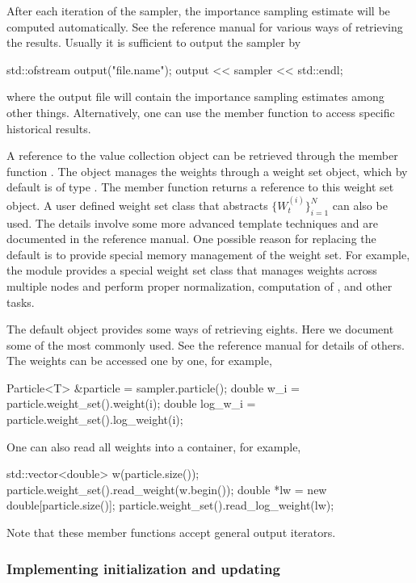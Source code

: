 \documentclass[11pt, bib, hyper, mint, minted=cache]{marticle}
\begin{document}
After each iteration of the sampler, the importance sampling estimate will be
computed automatically. See the reference manual for various ways of
retrieving the results. Usually it is sufficient to output the sampler by
\begin{cppcode}
std::ofstream output("file.name");
output << sampler << std::endl;
\end{cppcode}
where the output file will contain the importance sampling estimates among
other things. Alternatively, one can use the 
member function to access specific historical results.

A reference to the value collection  object can be retrieved
through the member function . The
 object manages the weights through a weight set
object, which by default is of type . The
 member function returns a reference to
this weight set object. A user defined weight set class that abstracts
$\{W_t^{(i)}\}_{i=1}^N$ can also be used. The details involve some more
advanced \cpp template techniques and are documented in the reference manual.
One possible reason for replacing the default is to provide special memory
management of the weight set. For example, the \lmpi module provides a special
weight set class that manages weights across multiple nodes and perform proper
normalization, computation of \ess, and other tasks.

The default  object provides some ways of retrieving
eights. Here we document some of the most commonly used. See the reference
manual for details of others. The weights can be accessed one by one, for
example,
\begin{cppcode}
Particle<T> &particle = sampler.particle();
double w_i     = particle.weight_set().weight(i);
double log_w_i = particle.weight_set().log_weight(i);
\end{cppcode}
One can also read all weights into a container, for example,
\begin{cppcode}
std::vector<double> w(particle.size());
particle.weight_set().read_weight(w.begin());
double *lw = new double[particle.size()];
particle.weight_set().read_log_weight(lw);
\end{cppcode}
Note that these member functions accept general output iterators.

\subsubsection{Implementing initialization and updating}
\end{document}
